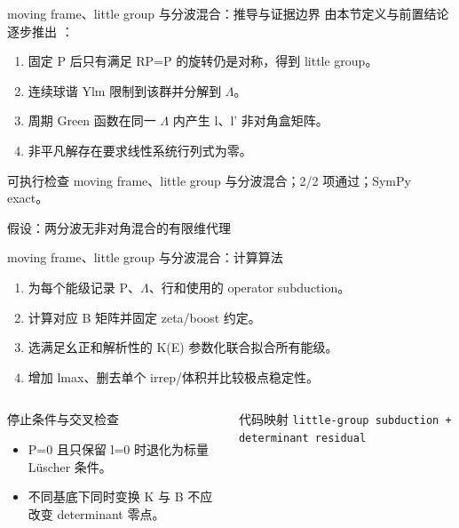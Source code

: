 \begin{frame}[t]{moving frame、little group 与分波混合：推导与证据边界}
\footnotesize
{}\quad 由本节定义与前置结论逐步推出 ：
\begin{enumerate}
\item 固定 P 后只有满足 RP=P 的旋转仍是对称，得到 little group。
\item 连续球谐 Ylm 限制到该群并分解到 \ensuremath{\Lambda}。
\item 周期 Green 函数在同一 \ensuremath{\Lambda} 内产生 l、l' 非对角盒矩阵。
\item 非平凡解存在要求线性系统行列式为零。
\end{enumerate}\begin{block}{可执行检查}
\quad moving frame、little group 与分波混合；2/2 项通过；SymPy exact。
\par\scriptsize 假设：两分波无非对角混合的有限维代理
\end{block}
\end{frame}

\begin{frame}[t]{moving frame、little group 与分波混合：计算算法}
\footnotesize
{}\begin{enumerate}
\item 为每个能级记录 P、\ensuremath{\Lambda}、行和使用的 operator subduction。
\item 计算对应 B 矩阵并固定 zeta/\allowbreak{}boost 约定。
\item 选满足幺正和解析性的 K(E) 参数化联合拟合所有能级。
\item 增加 lmax、删去单个 irrep/\allowbreak{}体积并比较极点稳定性。
\end{enumerate}\begin{columns}[T,onlytextwidth]
\begin{block}{停止条件与交叉检查}\scriptsize\begin{itemize}
\item[\CheckMark] P=0 且只保留 l=0 时退化为标量 Lüscher 条件。
\item[\CheckMark] 不同基底下同时变换 K 与 B 不应改变 determinant 零点。
\end{itemize}\end{block}
\begin{block}{代码映射}
\scriptsize \texttt{little-group subduction + determinant residual}
\end{block}\end{columns}\end{frame}

